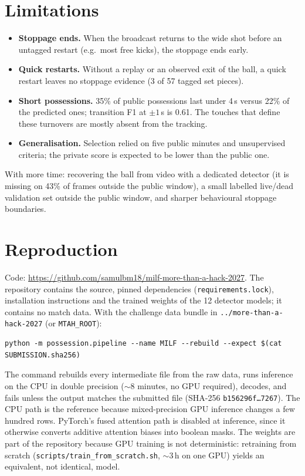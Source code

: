 \documentclass[10pt,a4paper]{article}
\newcommand{\repourl}{\url{https://github.com/samulbm18/milf-more-than-a-hack-2027}}
\newcommand{\code}[1]{\texttt{#1}}
\begin{document}
\section{Limitations}
\begin{itemize}
\item \textbf{Stoppage ends.} When the broadcast returns to the wide shot before an untagged restart
  (e.g.\ most free kicks), the stoppage ends early.
\item \textbf{Quick restarts.} Without a replay or an observed exit of the ball, a quick restart
  leaves no stoppage evidence (3 of 57 tagged set pieces).
\item \textbf{Short possessions.} 35\% of public possessions last under 4\,s versus 22\% of the
  predicted ones; transition F1 at $\pm1$\,s is 0.61. The touches that define these turnovers are
  mostly absent from the tracking.
\item \textbf{Generalisation.} Selection relied on five public minutes and unsupervised criteria; the
  private score is expected to be lower than the public one.
\end{itemize}
With more time: recovering the ball from video with a dedicated detector (it is missing on 43\% of
frames outside the public window), a small labelled live/dead validation set outside the public
window, and sharper behavioural stoppage boundaries.

\section{Reproduction}
Code: \repourl. The repository contains the source, pinned dependencies
(\code{requirements.lock}), installation instructions and the trained weights of the 12 detector
models; it contains no match data. With the challenge data bundle in \code{../more-than-a-hack-2027}
(or \code{MTAH\_ROOT}):
\begin{lstlisting}
python -m possession.pipeline --name MILF --rebuild --expect $(cat SUBMISSION.sha256)
\end{lstlisting}
The command rebuilds every intermediate file from the raw data, runs inference on the CPU in double
precision ($\sim$8 minutes, no GPU required), decodes, and fails unless the output matches the
submitted file (SHA-256 \code{b156296f\ldots7267}). The CPU path is the reference because
mixed-precision GPU inference changes a few hundred rows. PyTorch's fused attention path is disabled
at inference, since it otherwise converts additive attention biases into boolean masks. The weights
are part of the repository because GPU training is not deterministic: retraining from scratch
(\code{scripts/train\_from\_scratch.sh}, $\sim$3\,h on one GPU) yields an equivalent, not identical,
model.
\end{document}

